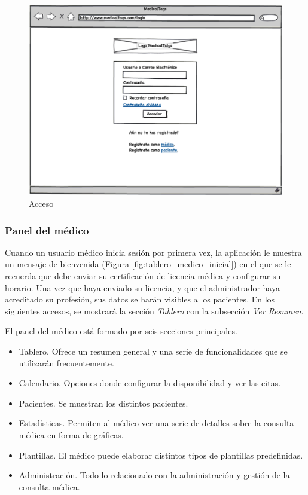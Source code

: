 			\begin{figure}[H]
			  \centering
			    \includegraphics[width=12cm]{img/eps/5_Acceso.eps}
			  \caption{Acceso}
			  \label{fig:interface_acceso}
			\end{figure}
			
	
	\subsubsection{Panel del médico} %
		\label{sub:panel_medico}
		
		Cuando un usuario médico inicia sesión por primera vez, la aplicación le muestra un mensaje de bienvenida (Figura \ref{fig:tablero_medico_inicial}) en el que se le recuerda que debe enviar su certificación de licencia médica y configurar su horario. Una vez que haya enviado su licencia, y que el administrador haya acreditado su profesión, sus datos se harán visibles a los pacientes. En los siguientes accesos, se mostrará la sección \textit{Tablero} con la subsección \textit{Ver Resumen}.		
	
		El panel del médico está formado por seis secciones principales.
		\begin{itemize}
			\item Tablero. Ofrece un resumen general y una serie de funcionalidades que se utilizarán frecuentemente.
			\item Calendario. Opciones donde configurar la disponibilidad y ver las citas.
			\item Pacientes. Se muestran los distintos pacientes.
			\item Estadísticas. Permiten al médico ver una serie de detalles sobre la consulta médica en forma de gráficas.
			\item Plantillas. El médico puede elaborar distintos tipos de plantillas predefinidas.
			\item Administración. Todo lo relacionado con la administración y gestión de la consulta médica.
		\end{itemize}
		
